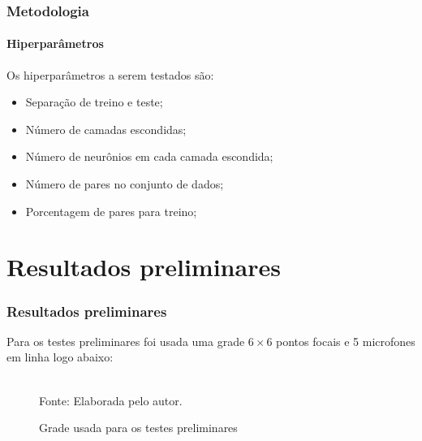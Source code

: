 \documentclass[aspectratio=169]{beamer}
\newcommand{\fautor}{Fonte: Elaborada pelo autor.}
\begin{document}
\begin{frame}
\frametitle{Metodologia}
\framesubtitle{Hiperparâmetros}

Os hiperparâmetros a serem testados são:
\begin{itemize}
    \item Separação de treino e teste;
    \item Número de camadas escondidas;
    \item Número de neurônios em cada camada escondida;
    \item Número de pares no conjunto de dados;
    \item Porcentagem de pares para treino;
\end{itemize}

\end{frame}


\section{Resultados preliminares}
\begin{frame}
\frametitle{Resultados preliminares}

Para os testes preliminares foi usada uma grade $6\times6$ pontos focais
e 5 microfones em linha logo abaixo:

\begin{figure}[H]
	\begin{center}
	\caption{Grade usada para os testes preliminares}
     \\
    \fautor
	\end{center}	
\end{figure}


\end{frame}
\end{document}
